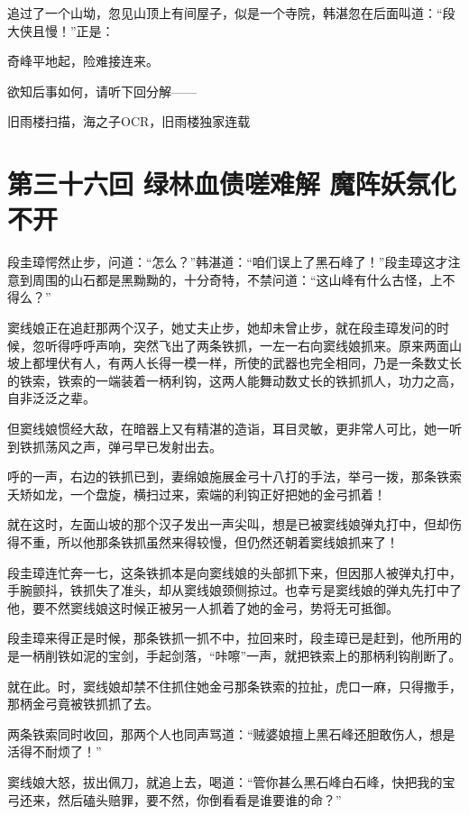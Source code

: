 \documentclass[12pt,oneside]{book}
\begin{document}
追过了一个山坳，忽见山顶上有间屋子，似是一个寺院，韩湛忽在后面叫道：``段大侠且慢！''正是：

奇峰平地起，险难接连来。

欲知后事如何，请听下回分解------

旧雨楼扫描，海之子OCR，旧雨楼独家连载

\chapter{第三十六回 绿林血债嗟难解
魔阵妖氛化不开}\label{ux7b2cux4e09ux5341ux516dux56de-ux7effux6797ux8840ux503aux55dfux96beux89e3-ux9b54ux9635ux5996ux6c1bux5316ux4e0dux5f00}

段圭璋愕然止步，问道：``怎么？''韩湛道：``咱们误上了黑石峰了！''段圭璋这才注意到周围的山石都是黑黝黝的，十分奇特，不禁问道：``这山峰有什么古怪，上不得么？''

窦线娘正在追赶那两个汉子，她丈夫止步，她却未曾止步，就在段圭璋发问的时候，忽听得呼呼声响，突然飞出了两条铁抓，一左一右向窦线娘抓来。原来两面山坡上都埋伏有人，有两人长得一模一样，所使的武器也完全相同，乃是一条数丈长的铁索，铁索的一端装着一柄利钩，这两人能舞动数丈长的铁抓抓人，功力之高，自非泛泛之辈。

但窦线娘惯经大敌，在暗器上又有精湛的造诣，耳目灵敏，更非常人可比，她一听到铁抓荡风之声，弹弓早已发射出去。

呼的一声，右边的铁抓已到，妻绵娘施展金弓十八打的手法，举弓一拨，那条铁索夭矫如龙，一个盘旋，横扫过来，索端的利钩正好把她的金弓抓着！

就在这时，左面山坡的那个汉子发出一声尖叫，想是已被窦线娘弹丸打中，但却伤得不重，所以他那条铁抓虽然来得较慢，但仍然还朝着窦线娘抓来了！

段圭璋连忙奔一七，这条铁抓本是向窦线娘的头部抓下来，但因那人被弹丸打中，手腕颤抖，铁抓失了准头，却从窦线娘颈侧掠过。也幸亏是窦线娘的弹丸先打中了他，要不然窦线娘这时候正被另一人抓着了她的金弓，势将无可抵御。

段圭璋来得正是时候，那条铁抓一抓不中，拉回来时，段圭璋已是赶到，他所用的是一柄削铁如泥的宝剑，手起剑落，``咔嚓''一声，就把铁索上的那柄利钩削断了。

就在此。时，窦线娘却禁不住抓住她金弓那条铁索的拉扯，虎口一麻，只得撒手，那柄金弓竟被铁抓抓了去。

两条铁索同时收回，那两个人也同声骂道：``贼婆娘擅上黑石峰还胆敢伤人，想是活得不耐烦了！''

窦线娘大怒，拔出佩刀，就追上去，喝道：``管你甚么黑石峰白石峰，快把我的宝弓还来，然后磕头赔罪，要不然，你倒看看是谁要谁的命？''
\end{document}
